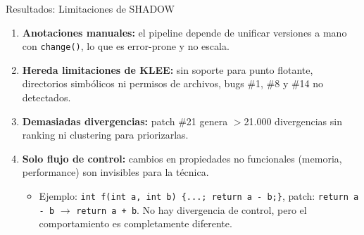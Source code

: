 \documentclass{beamer}
\begin{document}
\begin{frame}{Resultados: Limitaciones de SHADOW}
\begin{enumerate}
    \item \textbf{Anotaciones manuales:} el pipeline depende de unificar versiones a mano con \texttt{change()}, lo que es error-prone y no escala.
    \item \textbf{Hereda limitaciones de KLEE:} sin soporte para punto flotante, directorios simbólicos ni permisos de archivos, bugs \#1, \#8 y \#14 no detectados.
    \item \textbf{Demasiadas divergencias:} patch \#21 genera $>$21.000 divergencias sin ranking ni clustering para priorizarlas.
    \item \textbf{Solo flujo de control:} cambios en propiedades no funcionales (memoria, performance) son invisibles para la técnica.
    \begin{itemize}
        \item Ejemplo: \texttt{int f(int a, int b) \{...; return a - b;\}}, patch: \texttt{return a - b} $\to$ \texttt{return a + b}. No hay divergencia de control, pero el comportamiento es completamente diferente.
    \end{itemize}
\end{enumerate}
\end{frame}
\end{document}
